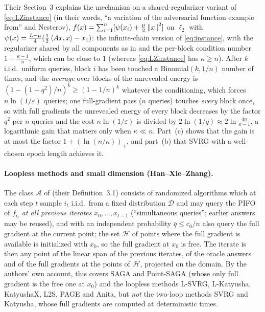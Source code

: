 Their Section~3 explains the mechanism on a shared-regularizer variant of \eqref{eq:LZinstance} (in their words, ``a variation of the adversarial function example from'' \cite{lan2018optimal} and Nesterov), $f(x)=\sum_{i=1}^n[\psi(x_i)+\frac\mu2\left\|x\right\|^2]$ on $\ell_2$ with $\psi(x)=\frac{L-\mu}4(\frac12\left\langle Ax, x \right\rangle-x_1)$: the infinite-chain version of \eqref{eq:instance}, with the regularizer shared by all components as in \cite{agarwal2015lower} and the per-block condition number $1+\frac{\kappa-1}n$, which can be close to $1$ (whereas \eqref{eq:LZinstance} has $\kappa\ge n$). After $k$ i.i.d.\ uniform queries, block $i$ has been touched a Binomial$(k,1/n)$ number of times, and the \emph{average} over blocks of the unrevealed energy is $(1-(1-q^2)/n)^k\ge(1-1/n)^k$ whatever the conditioning, which forces $n\ln(1/\varepsilon)$ queries; one full-gradient pass ($n$ queries) touches \emph{every} block once, so with full gradients the unrevealed energy of every block decreases by the factor $q^2$ per $n$ queries and the cost $n\ln(1/\varepsilon)$ is divided by $2\ln(1/q)\approx2\ln\frac{4n}{\kappa-1}$, a logarithmic gain that matters only when $\kappa\ll n$. Part~(c) shows that the gain is at most the factor $1+(\ln(n/\kappa))_+$, and part~(b) that SVRG with a well-chosen epoch length achieves it.

\paragraph{Loopless methods and small dimension (Han--Xie--Zhang).}
The class $\mathcal A$ of \cite{han2024lower} (their Definition~3.1) consists of randomized algorithms which at each step $t$ sample $i_t$ i.i.d.\ from a fixed distribution $\mathcal D$ and may query the PIFO of $f_{i_t}$ \emph{at all previous iterates} $x_0,\dots,x_{t-1}$ (``simultaneous queries''; earlier answers may be reused), and with an independent probability $\bar q\le c_0/n$ also query the full gradient at the current point; the set $\mathcal H$ of points where the full gradient is available is initialized with $x_0$, so the full gradient at $x_0$ is free. The iterate is then any point of the linear span of the previous iterates, of the oracle answers and of the full gradients at the points of $\mathcal H$, projected on the domain. By the authors' own account, this covers SAGA and Point-SAGA (whose only full gradient is the free one at $x_0$) and the loopless methods L-SVRG, L-Katyusha, KatyushaX, L2S, PAGE and Anita, but \emph{not} the two-loop methods SVRG and Katyusha, whose full gradients are computed at deterministic times.

